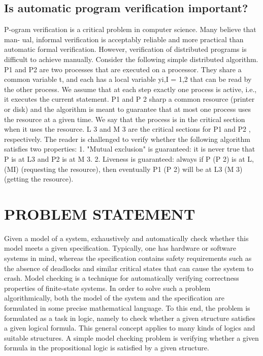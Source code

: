 \documentclass[12pt,letterpaper]{article}
\begin{document}
{\subsection{Is automatic program verification important?}
P-ogram verification is a critical problem in computer science. Many believe that man- ual, informal verification is acceptably reliable and more practical than automatic formal verification. However, verification of distributed programs is difficult to achieve manually.
Consider the following simple distributed algorithm. P1 and P2 are two processes that are executed on a processor. They share a common variable t, and each has a local variable yi,I = 1,2 that can be read by the other process. We assume that at each step exactly one process is active, i.e., it executes the current statement. P1 and P 2 sharp a common resource (printer or disk) and the algorithm is meant to guarantee that at most one process uses the resource at a given time. We say that the process is in the critical section when it uses the resource. L 3 and M 3 are the critical sections for P1 and P2 , respectively.
The reader is challenged to verify whether the following algorithm satisfies two properties:
1. "Mutual exclusion" is guaranteed: it is never true that P is at L3 and P2 is at M 3.
2. Liveness is guaranteed: always if P (P 2) is at L, (MI) (requesting the resource), then eventually P1 (P 2) will be at L3 (M 3) (getting the resource).

\section{PROBLEM STATEMENT}
Given a model of a system, exhaustively and automatically check whether this model meets a given specification. Typically, one has hardware or software systems in mind, whereas the specification contains safety requirements such as the absence of deadlocks and similar critical states that can cause the system to crash. Model checking is a technique for automatically verifying correctness properties of finite-state systems.
In order to solve such a problem algorithmically, both the model of the system and the specification are formulated in some precise mathematical language. To this end, the problem is formulated as a task in logic, namely to check whether a given structure satisfies a given logical formula. This general concept applies to many kinds of logics and suitable structures. A simple model checking problem is verifying whether a given formula in the propositional logic is satisfied by a given structure.

}
\end{document}
